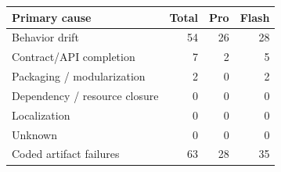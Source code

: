 \begin{tabular}{lrrr}
\toprule
\textbf{Primary cause} & \textbf{Total} & \textbf{Pro} & \textbf{Flash} \\
\midrule
Behavior drift & 54 & 26 & 28 \\
Contract/API completion & 7 & 2 & 5 \\
Packaging / modularization & 2 & 0 & 2 \\
Dependency / resource closure & 0 & 0 & 0 \\
Localization & 0 & 0 & 0 \\
Unknown & 0 & 0 & 0 \\
\midrule
Coded artifact failures & 63 & 28 & 35 \\
\bottomrule
\end{tabular}
